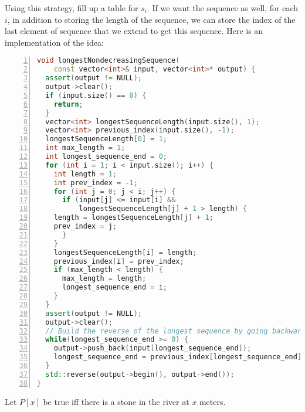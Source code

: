 Using this strategy, fill up a table for $s_i$. If we want the sequence as well, for
each $i$, in addition to storing the length of the sequence, we can
store the index of the last element of sequence that we extend to get
this sequence. Here is an implementation of the idea:
\begin{lstlisting}[basicstyle=\footnotesize,numbers=left,breaklines=true,language=C++]
void longestNondecreasingSequence(
    const vector<int>& input, vector<int>* output) {
  assert(output != NULL);
  output->clear();
  if (input.size() == 0) {
    return;
  }
  vector<int> longestSequenceLength(input.size(), 1);
  vector<int> previous_index(input.size(), -1);
  longestSequenceLength[0] = 1;
  int max_length = 1;
  int longest_sequence_end = 0;
  for (int i = 1; i < input.size(); i++) {
    int length = 1;
    int prev_index = -1;
    for (int j = 0; j < i; j++) {
      if (input[j] <= input[i] &&
          longestSequenceLength[j] + 1 > length) {
	length = longestSequenceLength[j] + 1;
	prev_index = j;
      }
    }
    longestSequenceLength[i] = length;
    previous_index[i] = prev_index;
    if (max_length < length) {
      max_length = length;
      longest_sequence_end = i;
    }
  }
  assert(output != NULL);
  output->clear();
  // Build the reverse of the longest sequence by going backwards from the end.
  while(longest_sequence_end >= 0) {
    output->push_back(input[longest_sequence_end]);
    longest_sequence_end = previous_index[longest_sequence_end];
  }
  std::reverse(output->begin(), output->end());
}
\end{lstlisting}

Let $P[x]$ be true iff there is a stone in the river at $x$ meters.

